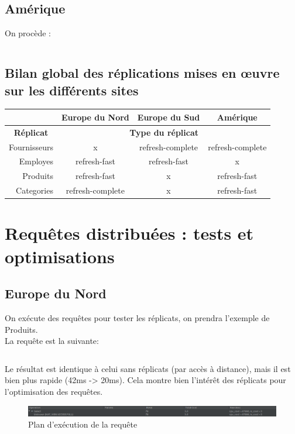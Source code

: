 \documentclass[10pt,a4paper]{article}
\theoremstyle{plain}
\begin{document}
\subsection{Amérique}
On procède :
\inputminted{sql}{AM_Replica.sql}

\subsection{Bilan global des réplications mises en \oe uvre sur les différents sites}
\begin{table}[H]
\begin{tabular}{|r|c|c|c|}
\hline
\multicolumn{1}{|l|}{} & \textbf{Europe du Nord} & \textbf{Europe du Sud} & \textbf{Amérique} \\ \hline
\multicolumn{1}{|c|}{\textbf{Réplicat}} & \multicolumn{3}{c|}{\textbf{Type du réplicat}} \\ \hline
Fournisseurs & x & refresh-complete & refresh-complete \\ \hline
Employes & refresh-fast & refresh-fast & x \\ \hline
Produits & refresh-fast & x & refresh-fast \\ \hline
Categories & refresh-complete & x & refresh-fast \\ \hline
\end{tabular}
\end{table}

\section{Requêtes distribuées : tests et optimisations}
\subsection{Europe du Nord}

On exécute des requêtes pour tester les réplicats, on prendra l'exemple de Produits.\\La requête est la suivante:

\inputminted{sql}{INSA-DB12-EuropeNord-replicats-tests.sql}

Le résultat est identique à celui sans réplicats (par accès à distance), mais il est bien plus rapide (42ms -> 20ms). Cela montre bien l'intérêt des réplicats pour l'optimisation des requêtes.

\begin{figure}[H]
    \centering
    \includegraphics[width=15cm]{INSA-DB12-EuropeNord-plan-exec-vues-replicat-produits.png}
    \caption{Plan d'exécution de la requête}
\end{figure}
\end{document}
